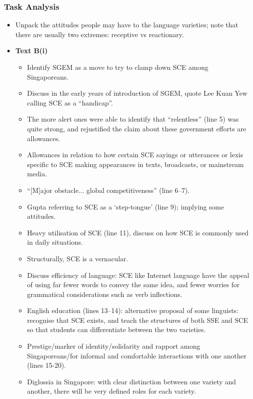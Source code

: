 \documentclass[../main.tex]{subfiles}
\begin{document}
        \subsubsection*{Task Analysis}
        \begin{itemize}
            \item Unpack the attitudes people may have to the language varieties; note that there are usually two extremes: receptive vs reactionary.
            \item \textbf{Text B(i)} \begin{itemize}
                \item Identify SGEM as a move to try to clamp down SCE among Singaporeans.
                \item Discuss in the early years of introduction of SGEM, quote Lee Kuan Yew calling SCE as a ``handicap''.
                \item The more alert ones were able to identify that ``relentless'' (line 5) was quite strong, and rejustified the claim about these government efforts are allowances.
                \item Allowances in relation to how certain SCE sayings or utterances or lexis specific to SCE making appearances in texts, broadcasts, or mainstream media.
                \item ``[M]ajor obstacle... global competitiveness'' (line 6--7).
                \item Gupta referring to SCE as a `step-tongue' (line 9); implying some attitudes.
                \item Heavy utilisation of SCE (line 11), discuss on how SCE is commonly used in daily situations.
                \item Structurally, SCE is a vernacular.
                \item Discuss efficiency of language: SCE like Internet language have the appeal of using far fewer words to convey the same idea, and fewer worries for grammatical considerations such as verb inflections. 
                \item English education (lines 13--14): alternative proposal of some linguists: recognise that SCE exists, and teach the structures of both SSE and SCE so that students can differentiate between the two varieties. 
                \item Prestige/marker of identity/solidarity and rapport among Singaporeans/for informal and comfortable interactions with one another (lines 15-20).
                \item Diglossia in Singapore: with clear distinction between one variety and another, there will be very defined roles for each variety.

\end{itemize}
\end{itemize}
\end{document}
